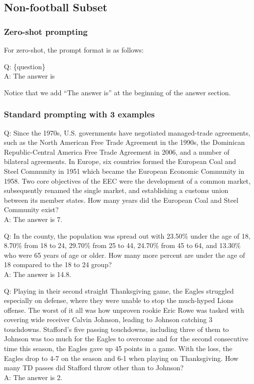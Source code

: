 \subsection{Non-football Subset}
\label{sec:drop-non-football}

\subsubsection{Zero-shot prompting}
For zero-shot, the prompt format is as follows:

Q: \{question\}\\
A: The answer is

Notice that we add ``The answer is'' at the beginning of the answer section.

\subsubsection{Standard prompting with 3 examples}

Q: Since the 1970s, U.S. governments have negotiated managed-trade agreements, such as the North American Free Trade Agreement in the 1990s, the Dominican Republic-Central America Free Trade Agreement in 2006, and a number of bilateral agreements. In Europe, six countries formed the European Coal and Steel Community in 1951 which became the European Economic Community in 1958. Two core objectives of the EEC were the development of a common market, subsequently renamed the single market, and establishing a customs union between its member states. How many years did the European Coal and Steel Community exist?\\
A: The answer is 7.

Q: In the county, the population was spread out with 23.50\% under the age of 18, 8.70\% from 18 to 24, 29.70\% from 25 to 44, 24.70\% from 45 to 64, and 13.30\% who were 65 years of age or older. How many more percent are under the age of 18 compared to the 18 to 24 group?\\
A: The answer is 14.8.

Q: Playing in their second straight Thanksgiving game, the Eagles struggled especially on defense, where they were unable to stop the much-hyped Lions offense. The worst of it all was how unproven rookie Eric Rowe was tasked with covering wide receiver Calvin Johnson, leading to Johnson catching 3 touchdowns. Stafford's five passing touchdowns, including three of them to Johnson was too much for the Eagles to overcome and for the second consecutive time this season, the Eagles gave up 45 points in a game. With the loss, the Eagles drop to 4-7 on the season and 6-1 when playing on Thanksgiving. How many TD passes did Stafford throw other than to Johnson?\\
A: The answer is 2.

